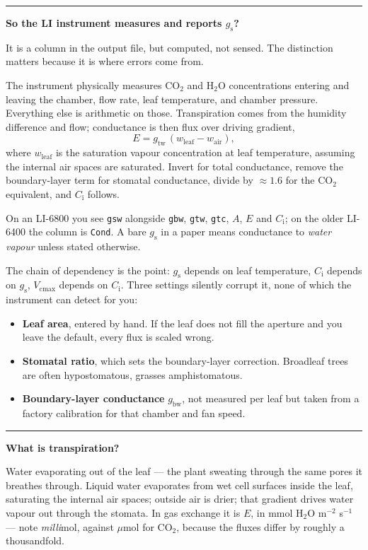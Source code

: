 \documentclass[11pt,letterpaper]{article}
\newcommand{\Vcmax}{\ensuremath{V_{\mathrm{cmax}}}}
\newcommand{\Ci}{\ensuremath{C_{\mathrm{i}}}}
\newcommand{\umol}{\ensuremath{\mu}mol}
\newcommand{\question}[1]{%
  \vspace{1.5em}%
  {\noindent\color{rulegray}\rule{\textwidth}{0.4pt}\par}%
  \vspace{0.7em}%
  {\noindent\color{accent}\bfseries #1\par}%
  \vspace{0.6em}%
}
\begin{document}
\question{So the LI instrument measures and reports $g_{\mathrm{s}}$?}

It is a column in the output file, but computed, not sensed. The distinction
matters because it is where errors come from.

The instrument physically measures CO$_2$ and H$_2$O concentrations entering and
leaving the chamber, flow rate, leaf temperature, and chamber pressure.
Everything else is arithmetic on those. Transpiration comes from the humidity
difference and flow; conductance is then flux over driving gradient,
\[
E = g_{\mathrm{tw}}\,(w_{\mathrm{leaf}} - w_{\mathrm{air}}),
\]
where $w_{\mathrm{leaf}}$ is the saturation vapour concentration at leaf
temperature, assuming the internal air spaces are saturated. Invert for total
conductance, remove the boundary-layer term for stomatal conductance, divide by
${\approx}1.6$ for the CO$_2$ equivalent, and \Ci{} follows.

On an LI-6800 you see \texttt{gsw} alongside \texttt{gbw}, \texttt{gtw},
\texttt{gtc}, $A$, $E$ and \Ci{}; on the older LI-6400 the column is
\texttt{Cond}. A bare $g_{\mathrm{s}}$ in a paper means conductance to
\emph{water vapour} unless stated otherwise.

The chain of dependency is the point: $g_{\mathrm{s}}$ depends on leaf
temperature, \Ci{} depends on $g_{\mathrm{s}}$, \Vcmax{} depends on \Ci{}. Three
settings silently corrupt it, none of which the instrument can detect for you:

\begin{itemize}
  \item \textbf{Leaf area}, entered by hand. If the leaf does not fill the
        aperture and you leave the default, every flux is scaled wrong.
  \item \textbf{Stomatal ratio}, which sets the boundary-layer correction.
        Broadleaf trees are often hypostomatous, grasses amphistomatous.
  \item \textbf{Boundary-layer conductance} $g_{\mathrm{bw}}$, not measured per
        leaf but taken from a factory calibration for that chamber and fan
        speed.
\end{itemize}

\question{What is transpiration?}

Water evaporating out of the leaf --- the plant sweating through the same pores
it breathes through. Liquid water evaporates from wet cell surfaces inside the
leaf, saturating the internal air spaces; outside air is drier; that gradient
drives water vapour out through the stomata. In gas exchange it is $E$, in mmol
H$_2$O m$^{-2}$ s$^{-1}$ --- note \emph{milli}mol, against \umol{} for CO$_2$,
because the fluxes differ by roughly a thousandfold.
\end{document}
